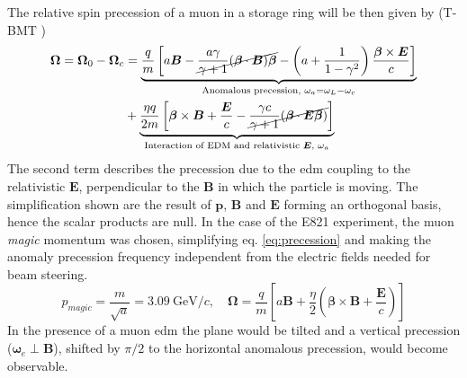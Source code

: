 \begin{refsection}
\begin{equation}
    \end{equation}
    The relative spin precession of a muon in a storage ring will be then given by (T-BMT \cite{miss-59})
    \begin{equation}
        \begin{split}
            \bm{\Omega}=\bm{\Omega}_0-\bm{\Omega}_c &=
            \underbrace{ 
                \frac{q}{m}\left[ a\bm{B} -\cancel{\frac{a\gamma}{\gamma+1}(\bm{\beta}\cdot \bm{B})\bm{\beta}} - \left(  a+\frac{1}{1-\gamma^2}\right)\frac{\bm{\beta} \times \bm{E}}{c} \right]
            }_{\text{Anomalous precession, } \omega_a=\omega_L-\omega_c} \\&+
            \underbrace{
                \frac{\eta q}{2m}\left[ \bm{\beta} \times \bm{B} + \frac{\bm{E}}{c}- \cancel{\frac{\gamma c}{\gamma+1}(\bm{\beta}\cdot\bm{E\beta})} \right]
            }_{\text{Interaction of EDM and relativistic $\bm{E}$, } \omega_a}
        \end{split}
        \label{eq:precession}
    \end{equation}
    The second term describes the precession due to the \gls{edm} coupling to the relativistic $\bm{E}$, perpendicular to the $\bm{B}$ in which the particle is moving. 
    The simplification shown are the result of $\bm{p}$, $\bm{B}$ and $\bm{E}$ forming an orthogonal basis, hence the scalar products are null.
    In the case of the E821 experiment, the muon \textit{magic} momentum was chosen, simplifying eq. \ref{eq:precession} and making the anomaly precession frequency independent from the electric fields needed for beam steering. 
    \begin{equation}
        p_{magic}=\frac{m}{\sqrt{a}}=3.09\ \text{GeV}/c, \quad
        \bm{\Omega} = \frac{q}{m} \left[ a\bm{B} +\frac{\eta}{2}\left( \bm{\beta}\times\bm{B} + \frac{\bm{E}}{c}\right) \right]
    \end{equation} 
    In the presence of a muon \gls{edm} the plane would be tilted and a vertical precession ($\bm{\omega}_e\perp\bm{B}$), shifted by $\pi/2$ to the horizontal anomalous precession, would become observable.


\end{refsection}
